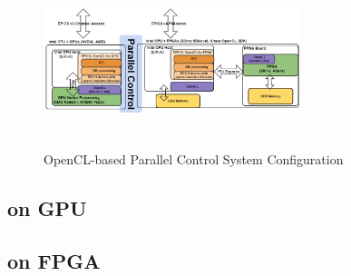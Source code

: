 \documentclass[journal]{IEEEtran}
\begin{document}
\begin{figure}[!htb]
	\centering
	\includegraphics*[width=75mm, height=50mm]{img02.png}
	\caption{OpenCL-based Parallel Control System Configuration}
	\label{opencl_control_system}
\end{figure}



\subsection{on GPU}


\subsection{on FPGA}
\end{document}
